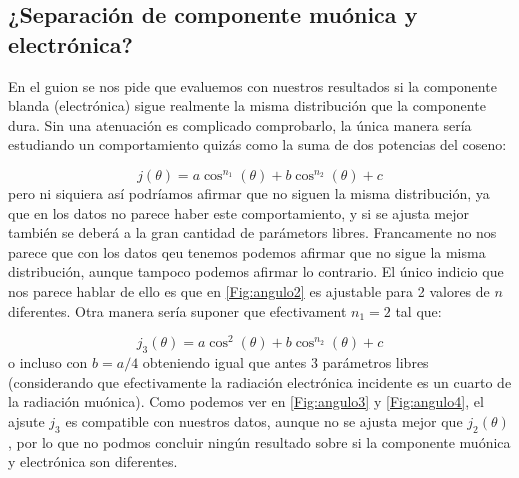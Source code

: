\documentclass[11pt]{article}
\begin{document}
\subsection{¿Separación de componente muónica y electrónica?}

En el guion se nos pide que evaluemos con nuestros resultados si la componente blanda (electrónica) sigue realmente la misma distribución que la componente dura. Sin una atenuación es complicado comprobarlo, la única manera sería estudiando un comportamiento quizás como la suma de dos potencias del coseno:

\begin{equation}
	j(\theta)=a \cos^{n_1}(\theta)+ b \cos^{n_2}(\theta) + c
\end{equation}
pero ni siquiera así podríamos afirmar que no siguen la misma distribución, ya que en los datos no parece haber este comportamiento, y si se ajusta mejor también se deberá a la gran cantidad de parámetors libres. Francamente no nos parece que con los datos qeu tenemos podemos afirmar que no sigue la misma distribución, aunque tampoco podemos afirmar lo contrario. El único indicio que nos parece hablar de ello es que en \cref{Fig:angulo2} es ajustable para 2 valores de $n$ diferentes. Otra manera sería suponer que efectivament $n_1=2$ tal que: 

\begin{equation}
	j_{3}(\theta)=a \cos^{2}(\theta)+ b \cos^{n_2}(\theta) + c
\end{equation}
o incluso con $b=a/4$ obteniendo igual que antes 3 parámetros libres (considerando que efectivamente la radiación electrónica incidente es un cuarto de la radiación muónica). Como podemos ver en \cref{Fig:angulo3} y \cref{Fig:angulo4}, el ajsute $j_3$ es compatible con nuestros datos, aunque no se ajusta mejor que $j_2(\theta)$, por lo que no podmos concluir ningún resultado sobre si la componente muónica y electrónica son diferentes.
\end{document}
